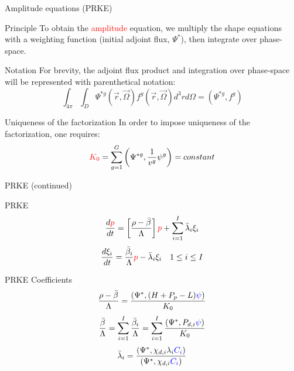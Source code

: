 \documentclass[8pt]{beamer}
\newcommand{\tcr}[1]{\textcolor{red}{#1}}
\newcommand{\tcb}[1]{\textcolor{blue}{#1}}
\begin{document}
\begin{frame}{Amplitude equations (PRKE)}

\begin{block}{Principle}
To obtain the \tcr{amplitude} equation, we multiply the shape equations with a weighting 
function (initial adjoint flux, $\Psi^*$), then integrate over phase-space.  
\end{block}

\begin{block}{Notation}
For brevity, the adjoint flux product and integration over phase-space will be represented with parenthetical notation:
\[
\int_{4\pi}\int_D\Psi^{*g}(\vec{r},\vec{\Omega})f^g(\vec{r},\vec{\Omega})d^3rd\Omega=\left(\Psi^{*g},f^g\right)
\]
\end{block}


\begin{block}{Uniqueness of the factorization}
In order to impose uniqueness of the factorization, one requires:
\[
\tcr{K_0} = \sum_{g=1}^G\left(\Psi^{*g},\frac{1}{v^g}\psi^g\right)= constant
\]
\end{block}


\end{frame}

\begin{frame}{PRKE (continued)}

\begin{block}{PRKE}
\[
\frac{d\tcr{p}}{dt}=\left[\frac{\rho-\bar{\beta}}{\Lambda}\right]\tcr{p}+\sum_{i=1}^I\bar{\lambda}_i\xi_i
\]
\[
\frac{d\xi_i}{dt}=\frac{\bar{\beta}_i}{\Lambda}\tcr{p} - \bar{\lambda}_i\xi_i \quad 1 \le i \le I 
\]
\end{block}

\begin{block}{PRKE Coefficients}
\[
\frac{\rho-\bar{\beta}}{\Lambda}=
\frac{ \left( \Psi^{*}, (H+P_p-L) \tcb{\psi} \right)}{K_0}
\]
\[
\frac{\bar{\beta}}{\Lambda}=\sum_{i=1}^I\frac{\bar{\beta}_i}{\Lambda}=
\sum_{i=1}^I \frac{ \left(\Psi^{*}, P_{d,i} \tcb{\psi} \right)}{K_0}
\]
\[
\bar{\lambda}_i=\frac{(\Psi^{*},\chi_{d,i}\lambda_i \tcb{C_i})}{(\Psi^{*},\chi_{d,i}\tcb{C_i})}
\]
\end{block}

\end{frame}
\end{document}
